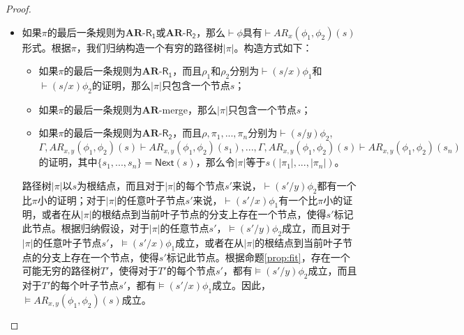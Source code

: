 \begin{proof}
\begin{itemize}
		
		\item 如果$\pi$的最后一条规则为$\mathbf{AR}$-$\mathsf{R_1}$或$\mathbf{AR}$-$\mathsf{R_2}$，那么$\vdash \phi$具有$\vdash AR_x(\phi_1,\phi_2)(s)$形式。根据$\pi$，我们归纳构造一个有穷的路径树$|\pi|$。构造方式如下：
		\begin{itemize}
			
			\item 如果$\pi$的最后一条规则为$\mathbf{AR}$-$\mathsf{R_1}$，而且$\rho_1$和$\rho_2$分别为$\vdash (s/x)\phi_1$和$\vdash (s/x)\phi_2$的证明，那么$|\pi|$只包含一个节点$s$；
			\item 如果$\pi$的最后一条规则为$\mathbf{AR}$-merge，那么$|\pi|$只包含一个节点$s$；
			
			
			
			\item 如果$\pi$的最后一条规则为$\mathbf{AR}$-$\mathsf{R_2}$，而且$\rho, \pi_1,...,\pi_n$分别为$\vdash (s/y)\phi_2$, $\Gamma, AR_{x,y}(\phi_1, \phi_2)(s) \vdash AR_{x,y}(\phi_1, \phi_2)(s_1),...,\Gamma, AR_{x,y}(\phi_1, \phi_2)(s)\vdash AR_{x,y}(\phi_1, \phi_2)(s_n)$的证明，其中$\{s_1,...,s_n\}=\mathsf{Next}(s)$，那么令$|\pi|$等于$s(|\pi_1|, ..., |\pi_n|)$。
			
		\end{itemize}
		路径树$|\pi|$以$s$为根结点，而且对于$|\pi|$的每个节点$s'$来说，$\vdash (s'/y)\phi_2$都有一个比$\pi$小的证明；对于$|\pi|$的任意叶子节点$s'$来说，$\vdash (s'/x)\phi_1$有一个比$\pi$小的证明，或者在从$|\pi|$的根结点到当前叶子节点的分支上存在一个节点，使得$s'$标记此节点。根据归纳假设，对于$|\pi|$的任意节点$s'$，$\models (s'/y)\phi_2$成立，而且对于$|\pi|$的任意叶子节点$s'$，$\models (s'/x)\phi_1$成立，或者在从$|\pi|$的根结点到当前叶子节点的分支上存在一个节点，使得$s'$标记此节点。根据命题\ref{prop:fit}，存在一个可能无穷的路径树$T'$，使得对于$T'$的每个节点$s'$，都有$\models (s'/y)\phi_2$成立，而且对于$T'$的每个叶子节点$s'$，都有$\models (s'/x)\phi_1$成立。因此，$\models AR_{x,y}(\phi_1, \phi_2)(s)$成立。
		

\end{itemize}
\end{proof}
